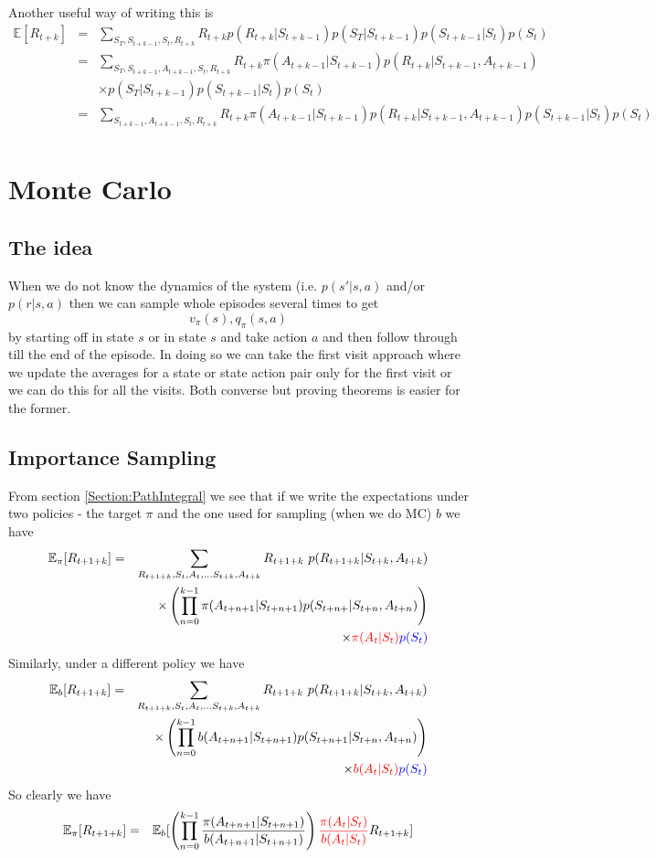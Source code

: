 \documentclass[11pt,a4paper]{article}
\newcommand\be{\begin{equation}}
\newcommand\bea{\begin{eqnarray}}
\newcommand\ee{\end{equation}}
\newcommand\eea{\end{eqnarray}}
\newcommand{\nn}{\nonumber \\}
\begin{document}
Another useful way of writing this is
\bea
\mathbb E[ R_{t+k}] &=& \sum_{S_T,S_{t+k-1},S_t,R_{t+k}} R_{t+k} p(R_{t+k}|S_{t+k-1}) p(S_T|S_{t+k-1}) p(S_{t+k-1}|S_t) p(S_t) \nn
&=& \sum_{S_T,S_{t+k-1},A_{t+k-1}, S_t,R_{t+k}} R_{t+k} \pi(A_{t+k-1}|S_{t+k-1}) p(R_{t+k}|S_{t+k-1}, A_{t+k-1}) \nn
&& \times p(S_T|S_{t+k-1}) p(S_{t+k-1}|S_t) p(S_t) \nn
&=& \sum_{S_{t+k-1},A_{t+k-1},S_t,R_{t+k}} R_{t+k} \pi(A_{t+k-1}|S_{t+k-1}) p(R_{t+k}|S_{t+k-1}, A_{t+k-1}) p(S_{t+k-1}|S_t) p(S_t) \nn
\eea


\section{Monte Carlo}

\subsection{The idea}

When we do not know the dynamics of the system (i.e. $p(s'|s,a)$ and/or $p(r|s,a)$ then we can sample whole episodes several times to get
\be
v_\pi(s), q_\pi(s,a)
\ee 
by starting off in state $s$ or in state $s$ and take action $a$ and then follow through till the end of the episode. In doing so we can take the first visit approach where we update the averages for a state or state action pair only for the first visit or we can do this for all the visits. Both converse but proving theorems is easier for the former.

\subsection{Importance Sampling}

From section \ref{Section:PathIntegral} we see that if we write the expectations under two policies - the target $\pi$ and the one used for sampling (when we do MC) $b$ we have
\bea
\mathbb E_{\pi}[R_{t+1+k}] &=& \sum_{R_{t+1+k}, S_t,A_t, \dots S_{t+k}, A_{t+k}} R_{t+1+k} ~ p(R_{t+1+k}| S_{t+k},A_{t+k}) \nn
&& \times \left( \prod_{n=0}^{k-1} \pi(A_{t+n+1} | S_{t+n+1} ) p( S_{t+n+} | S_{t+n}, A_{t+n}) \right) \nn
&&\times \color{red}{\pi(A_t|S_t)} \color{blue}{p(S_t)} 
\eea
Similarly, under a different policy we have
\bea
\mathbb E_{b}[R_{t+1+k}] &=& \sum_{R_{t+1+k}, S_t,A_t, \dots S_{t+k}, A_{t+k}} R_{t+1+k} ~ p(R_{t+1+k}| S_{t+k},A_{t+k}) \nn
&& \times \left( \prod_{n=0}^{k-1} b(A_{t+n+1} | S_{t+n+1} ) p( S_{t+n+1} | S_{t+n}, A_{t+n}) \right) \nn
&&\times \color{red}{b(A_t|S_t)} \color{blue}{p(S_t)} 
\eea
So clearly we have
\bea
\mathbb E_{\pi}[R_{t+1+k}] &=& \mathbb E_{b}[ \left( \prod_{n=0}^{k-1} \frac{\pi(A_{t+n+1} | S_{t+n+1} )}{b(A_{t+n+1} | S_{t+n+1} )} \right) {\color{red}\frac{\pi(A_{t} | S_{t} )}{b(A_{t} | S_{t} )}}   R_{t+1+k}] 
\eea
\end{document}
